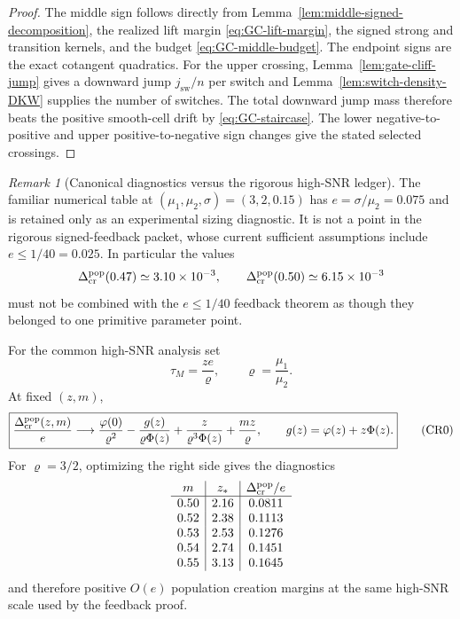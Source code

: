 \documentclass{article} %
\theoremstyle{plain}
\theoremstyle{definition}
\theoremstyle{remark}
\newtheorem{remark}[theorem]{Remark}
\begin{document}
\begin{proof}
The middle sign follows directly from
Lemma~\ref{lem:middle-signed-decomposition}, the realized lift margin
\eqref{eq:GC-lift-margin}, the signed strong and transition kernels, and the
budget \eqref{eq:GC-middle-budget}.  The endpoint signs are the exact
cotangent quadratics.  For the upper crossing,
Lemma~\ref{lem:gate-cliff-jump} gives a downward jump $j_{\mathrm{sw}}/n$ per
switch and Lemma~\ref{lem:switch-density-DKW} supplies the number of switches.
The total downward jump mass therefore beats the positive smooth-cell drift
by \eqref{eq:GC-staircase}.  The lower negative-to-positive and upper
positive-to-negative sign changes give the stated selected crossings.
\end{proof}

\begin{remark}[Canonical diagnostics versus the rigorous high-SNR ledger]
\label{rem:canonical-creation-sizing}
The familiar numerical table at $(\mu_1,\mu_2,\sigma)=(3,2,0.15)$ has
$e=\sigma/\mu_2=0.075$ and is retained only as an experimental sizing
diagnostic.  It is not a point in the rigorous signed-feedback packet, whose
current sufficient assumptions include $e\le1/40=0.025$.  In particular the
values
\[
 \Delta_{\rm cr}^{\rm pop}(0.47)\simeq3.10\times10^{-3},\qquad
 \Delta_{\rm cr}^{\rm pop}(0.50)\simeq6.15\times10^{-3}
\]
must not be combined with the $e\le1/40$ feedback theorem as though they
belonged to one primitive parameter point.

For the common high-SNR analysis set
\[
 \tau_M=\frac{ze}{\varrho},\qquad \varrho=\frac{\mu_1}{\mu_2}.
\]
At fixed $(z,m)$,
\[
\boxed{
 \frac{\Delta_{\rm cr}^{\rm pop}(z,m)}e
 \longrightarrow
 \frac{\varphi(0)}{\varrho^2}
 -\frac{g(z)}{\varrho\Phi(z)}
 +\frac{z}{\varrho^3\Phi(z)}
 +\frac{mz}{\varrho},
 \qquad g(z)=\varphi(z)+z\Phi(z).
}
\tag{CR0}\label{eq:CR0}
\]
For $\varrho=3/2$, optimizing the right side gives the diagnostics
\[
\begin{array}{c|c|c}
 m&z_*&\Delta_{\rm cr}^{\rm pop}/e\\ \hline
 0.50&2.16&0.0811\\
 0.52&2.38&0.1113\\
 0.53&2.53&0.1276\\
 0.54&2.74&0.1451\\
 0.55&3.13&0.1645
\end{array}
\]
and therefore positive $O(e)$ population creation margins at the same
high-SNR scale used by the feedback proof.


\end{remark}
\end{document}
